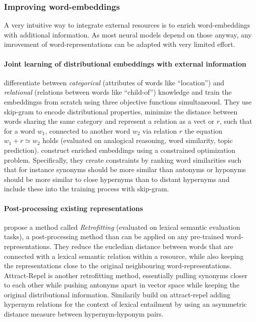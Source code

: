 \subsubsection{Improving word-embeddings}
A very intuitive way to integrate external resources is to enrich word-embeddings with additional information. As most neural models depend on those anyway, any imrovement of word-representations can be adapted with very limited effort.

\paragraph*{Joint learning of distributional embeddings with external information}
\cite{xu2014rc} differentiate between \textit{categorical} (attributes of words like ``location'') and \textit{relational} (relations between words like ``child-of'') knowledge and train the embeddingss from scratch using three objective functions simultaneousl. They use skip-gram to encode distributional properties, minimize the distance between words sharing the same category and represent a relation as a vect or $r$, such that for a word $w_1$, connected to another word $w_2$ via relation $r$ the equation $w_1 + r \simeq w_2$ holds (evaluated on analogical reasoning, word similarity, topic prediction). \cite{liu2015learning} construct enriched embeddings using a constrained optimization problem. Specifically, they create constraints by ranking word similarities such that for instance synonyms should be more similar than antonyms or hyponyms should be more similar to close hypernyms than to distant hypernyms and include these into the training process with skip-gram. 
\paragraph*{Post-processing existing representations}
 \cite{faruqui2015retrofitting} propose a method called \textit{Retrofitting} (evaluated on lexical semantic evaluation tasks), a post-processing method than can be applied on any pre-trained word-representations. They reduce the eucledian distance between words that are connected with a lexical semantic relation within a resource, while also keeping the representations close to the original neighbouring word-representations. Attract-Repel \citep{mrkvsic2017semantic} is another retrofitting method, essentially pulling synonyms closer to each other while pushing antonyms apart in vector space while keeping the original distributional information. Similarily \cite{vulic2017specialising} build on attract-repel adding hypernym relations for the context of lexical entailment by using an asymmetric distance measure between hypernym-hyponym pairs.
 
